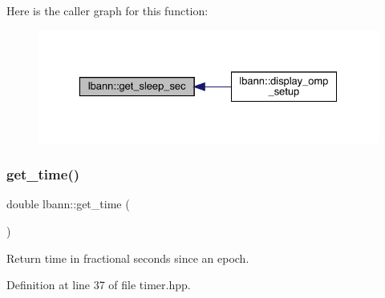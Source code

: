 Here is the caller graph for this function\+:\nopagebreak
\begin{figure}[H]
\begin{center}
\leavevmode
\includegraphics[width=329pt]{namespacelbann_a17d55032bad5bb02903f9b1d933836a4_icgraph}
\end{center}
\end{figure}
\mbox{\label{namespacelbann_a478d36031ff0659893c4322cd856157f}} 
\subsubsection{\texorpdfstring{get\+\_\+time()}{get\_time()}}
{\footnotesize\ttfamily double lbann\+::get\+\_\+time (\begin{DoxyParamCaption}{ }\end{DoxyParamCaption})\hspace{0.3cm}{\ttfamily [inline]}}

Return time in fractional seconds since an epoch. 

Definition at line 37 of file timer.\+hpp.


